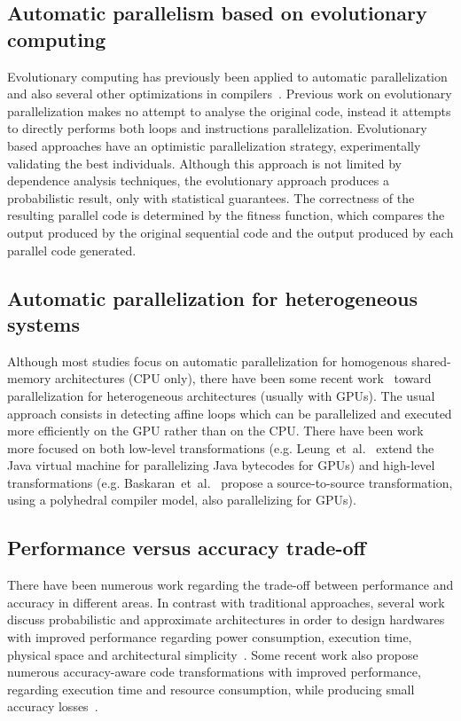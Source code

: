 \documentclass[a4paper,12pt]{article}
\newcommand{\etal}{et~al.}
\begin{document}
\subsection{Automatic parallelism based on evolutionary computing}

Evolutionary computing has previously been applied to automatic parallelization
and also several other optimizations in
compilers~\cite{walsh95,walsh96,williams96,williams99,schulte14a}.  Previous
work on evolutionary parallelization makes no attempt to analyse the original
code, instead it attempts to directly performs both loops and instructions
parallelization.  Evolutionary based approaches have an optimistic
parallelization strategy, experimentally validating the best individuals.
Although this approach is not limited by dependence analysis techniques, the
evolutionary approach produces a probabilistic result, only with statistical
guarantees.  The correctness of the resulting parallel code is determined by
the fitness function, which compares the output produced by the original
sequential code and the output produced by each parallel code generated.

\subsection{Automatic parallelization for heterogeneous systems}

Although most studies focus on automatic parallelization for homogenous
shared-memory architectures (CPU only), there have been some recent
work~\cite{leung09,baskaran10,amini12,govindarajan13} toward parallelization
for heterogeneous architectures (usually with GPUs).  The usual approach
consists in detecting affine loops which can be parallelized and executed more
efficiently on the GPU rather than on the CPU.  There have been work more
focused on both low-level transformations (e.g. Leung~\etal~\cite{leung09}
extend the Java virtual machine for parallelizing Java bytecodes for GPUs) and
high-level transformations (e.g. Baskaran~\etal~\cite{baskaran08,baskaran10}
propose a source-to-source transformation, using a polyhedral compiler model,
also parallelizing for GPUs).

\subsection{Performance versus accuracy trade-off}
\label{subsec:perfvsacc}

There have been numerous work regarding the trade-off between performance and
accuracy in different areas.  In contrast with traditional approaches, several
work discuss probabilistic and approximate architectures in order to design
hardwares with improved performance regarding power consumption, execution
time, physical space and architectural
simplicity~\cite{palem09,palem12,lingamneni12,kirsch12}.  Some recent work also
propose numerous accuracy-aware code transformations with improved performance,
regarding execution time and resource consumption, while producing small
accuracy losses~\cite{misailovic11,douskos11,zhu12}.
\end{document}
